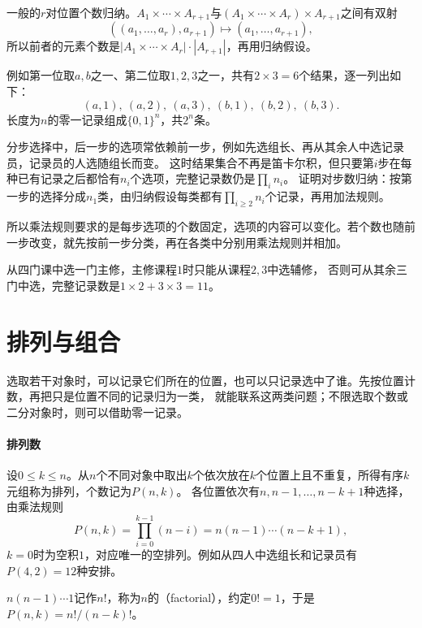 一般的$r$对位置个数归纳。$A_1\times\cdots\times A_{r+1}$与$(A_1\times\cdots\times A_r)\times A_{r+1}$之间有双射
\[
 ((a_1,\ldots,a_r),a_{r+1})\mapsto(a_1,\ldots,a_{r+1}),
\]
所以前者的元素个数是$|A_1\times\cdots\times A_r|\cdot|A_{r+1}|$，再用归纳假设。

例如第一位取$a,b$之一、第二位取$1,2,3$之一，共有$2\times3=6$个结果，逐一列出如下：
\[
 (a,1),\ (a,2),\ (a,3),\ (b,1),\ (b,2),\ (b,3).
\]
长度为$n$的零一记录组成$\{0,1\}^n$，共$2^n$条。

分步选择中，后一步的选项常依赖前一步，例如先选组长、再从其余人中选记录员，记录员的人选随组长而变。
这时结果集合不再是笛卡尔积，但只要第$i$步在每种已有记录之后都恰有$n_i$个选项，完整记录数仍是$\prod_in_i$。
证明对步数归纳：按第一步的选择分成$n_1$类，由归纳假设每类都有$\prod_{i\geq2}n_i$个记录，再用加法规则。

所以乘法规则要求的是每步选项的个数固定，选项的内容可以变化。若个数也随前一步改变，就先按前一步分类，再在各类中分别用乘法规则并相加。
\begin{example}[辅修选项随主修变化]
\label{ex:comb-major-minor}
从四门课中选一门主修，主修课程$1$时只能从课程$2,3$中选辅修，
否则可从其余三门中选，完整记录数是$1\times2+3\times3=11$。
\end{example}

\section{排列与组合}
\label{sec:comb-permutation-combination-counts}
\label{sec:comb-subset-partition-counts}

选取若干对象时，可以记录它们所在的位置，也可以只记录选中了谁。先按位置计数，再把只是位置不同的记录归为一类，
就能联系这两类问题；不限选取个数或二分对象时，则可以借助零一记录。

\paragraph{排列数}
设$0\leq k\leq n$。从$n$个不同对象中取出$k$个依次放在$k$个位置上且不重复，所得有序$k$元组称为排列，个数记为$P(n,k)$。
各位置依次有$n,n-1,\ldots,n-k+1$种选择，由乘法规则
\begin{equation}
 P(n,k)=\prod_{i=0}^{k-1}(n-i)=n(n-1)\cdots(n-k+1),
 \label{eq:comb-permutation-count}
\end{equation}
$k=0$时为空积$1$，对应唯一的空排列。例如从四人中选组长和记录员有$P(4,2)=12$种安排。

$n(n-1)\cdots1$记作$n!$，称为$n$的（factorial），约定$0!=1$，于是$P(n,k)=n!/(n-k)!$。

